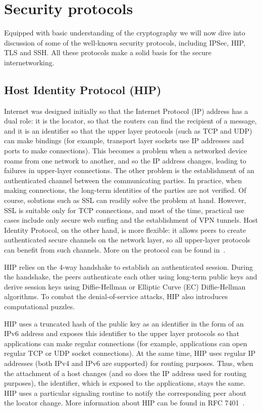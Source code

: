\section{Security protocols}

Equipped with basic understanding of the cryptography we will now dive into discussion of some 
of the well-known security protocols, including IPSec, HIP, TLS and SSH. All these protocols
make a solid basis for the secure internetworking.

\subsection{Host Identity Protocol (HIP)}

Internet was designed initially so that the Internet Protocol (IP) address has a dual role: it 
is the locator, so that the routers can find the recipient of a message, and it is an identifier 
so that the upper layer protocols (such as TCP and UDP) can make bindings (for example, transport 
layer sockets use IP addresses and ports to make connections). This becomes a problem when a networked 
device roams from one network to another, and so the IP address changes, leading to failures in 
upper-layer connections. The other problem is the establishment of an authenticated channel between 
the communicating parties. In practice, when making connections, the long-term identities of the parties 
are not verified. Of course, solutions such as SSL can readily solve the problem at hand. However, SSL 
is suitable only for TCP connections, and most of the time, practical use cases include only secure web 
surfing and the establishment of VPN tunnels. Host Identity Protocol, on the other hand, is more flexible: 
it allows peers to create authenticated secure channels on the network layer, so all upper-layer protocols 
can benefit from such channels. More on the protocol can be found in~\cite{gurtov:hip}.

HIP relies on the 4-way handshake to establish an authenticated session. During the handshake, the 
peers authenticate each other using long-term public keys and derive session keys using Diffie-Hellman 
or Elliptic Curve (EC) Diffie-Hellman algorithms. To combat the denial-of-service attacks, HIP also 
introduces computational puzzles. 

HIP uses a truncated hash of the public key as an identifier in the form of an IPv6 address and 
exposes this identifier to the upper layer protocols so that applications can make regular 
connections (for example, applications can open regular TCP or UDP socket connections). At the 
same time, HIP uses regular IP addresses (both IPv4 and IPv6 are supported) for routing purposes. 
Thus, when the attachment of a host changes (and so does the IP address used for routing purposes), 
the identifier, which is exposed to the applications, stays the same. HIP uses a particular 
signaling routine to notify the corresponding peer about the locator change. More information 
about HIP can be found in RFC 7401~\cite{rfc7401}. 

